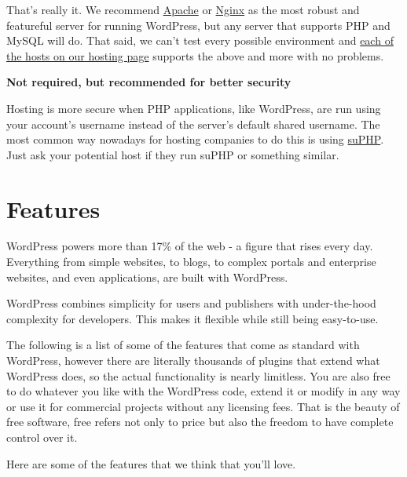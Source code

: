 That’s really it. We recommend \href{http://httpd.apache.org/}{Apache} or \href{http://nginx.net/}{Nginx} as the most robust and featureful server for running WordPress, but any server that supports PHP and MySQL will do. That said, we can’t test every possible environment and \href{http://wordpress.org/hosting/}{each of the hosts on our hosting page} supports the above and more with no problems.

\textbf{Not required, but recommended for better security}

Hosting is more secure when PHP applications, like WordPress, are run using your account’s username instead of the server’s default shared username. The most common way nowadays for hosting companies to do this is using \href{http://www.suphp.org/}{suPHP}. Just ask your potential host if they run suPHP or something similar.

\chapter{Features}

WordPress powers more than 17\% of the web - a figure that rises every day. Everything from simple websites, to blogs, to complex portals and enterprise websites, and even applications, are built with WordPress.

WordPress combines simplicity for users and publishers with under-the-hood complexity for developers. This makes it flexible while still being easy-to-use.

The following is a list of some of the features that come as standard with WordPress, however there are literally thousands of plugins that extend what WordPress does, so the actual functionality is nearly limitless. You are also free to do whatever you like with the WordPress code, extend it or modify in any way or use it for commercial projects without any licensing fees. That is the beauty of free software, free refers not only to price but also the freedom to have complete control over it.

Here are some of the features that we think that you'll love.








